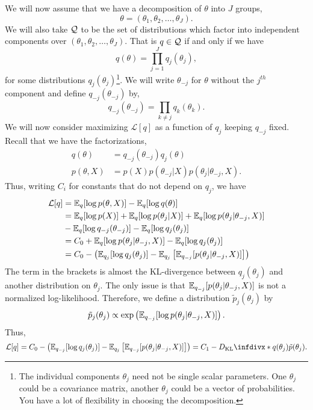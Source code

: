 We will now assume that we have a decomposition of $\theta$ into $J$ groups,
\[\theta = (\theta_1,\theta_2,\ldots,\theta_J). \]
We will also take $\mathcal{Q}$ to be the set of distributions which factor into independent components over $(\theta_1,\theta_2,\ldots,\theta_J)$. That is $q \in \mathcal{Q}$ if and only if we have
\[q(\theta) = \prod_{j=1}^J q_j(\theta_j), \]
for some distributions $q_j(\theta_j)$\footnote{The individual components $\theta_j$ need not be single scalar parameters. One $\theta_j$ could be a covariance matrix, another $\theta_j$ could be a vector of probabilities. You have a lot of flexibility in choosing the decomposition.}. We will write $\theta_{-j}$ for $\theta$ without the $j^{th}$ component and define $q_{-j}(\theta_{-j})$ by,
\[q_{-j}(\theta_{-j}) = \prod_{k \neq j}q_k(\theta_k). \]
We will now consider maximizing $\mathcal{L}[q]$ as a function of $q_{j}$ keeping $q_{-j}$ fixed. Recall that we have the factorizations,
\begin{align*}
    q(\theta)&=q_{-j}(\theta_{-j})q_j(\theta)\\
    p(\theta,X)&=p(X)p(\theta_{-j}|X)p(\theta_j |  \theta_{-j},X).
\end{align*}
Thus, writing $C_i$ for constants that do not depend on $q_{j}$, we have
\begin{align*}
    \mathcal{L}[q]&={\mathbb E}_{q}[\log p(\theta,X)] - {\mathbb E}_{q}[\log q(\theta)]\\
    &={\mathbb E}_q[\log p(X)] + {\mathbb E}_q[\log p(\theta_j  |  X)] + {\mathbb E}_{q}[\log p(\theta_j  |  \theta_{-j},X)]\\
    & - {\mathbb E}_{q}[\log q_{-j}(\theta_{-j})] - {\mathbb E}_{q}[\log q_j(\theta_j)]\\
    &=C_0 + {\mathbb E}_q[\log p(\theta_j |  \theta_{-j},X)] - {\mathbb E}_{q}[\log q_j(\theta_j)]\\
    &=C_0 - \left({\mathbb E}_{q_{j}}[\log q_j(\theta_j)]-{\mathbb E}_{q_j}\left[{\mathbb E}_{q_{-j}}[p(\theta_j |  \theta_{-j},X)]\right]  \right)
\end{align*}
The term in the brackets is almost the KL-divergence between $q_{j}(\theta_{j})$ and another distribution on $\theta_{j}$. The only issue is that ${\mathbb E}_{q_{-j}}[p(\theta_j  |  \theta_{-j},X)]$ is not a normalized log-likelihood. Therefore, we define a distribution $\tilde{p}_j(\theta_j)$ by
\[\tilde{p}_j(\theta_j) \propto \exp\left({\mathbb E}_{q_{-j}}[\log p(\theta_j  |  \theta_{-j},X)]\right). \]
Thus,
\[\mathcal{L}[q] = C_0 - \left(\bbE_{q_{-j}}[\log q_j(\theta_j)]-\bbE_{q_j}\left[\bbE_{q_{-j}}[p(\theta_j |  \theta_{-j},X)]\right]  \right) = C_1 - \KLD{q(\theta_j)}{\tilde{p}(\theta_j)}.  \]
